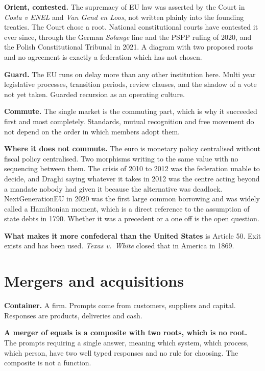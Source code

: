 \documentclass[11pt,a4paper]{article}
\begin{document}
\textbf{Orient, contested.} The supremacy of EU law was asserted by the Court in
\emph{Costa v ENEL} and \emph{Van Gend en Loos}, not written plainly into the
founding treaties. The Court chose a root. National constitutional courts have
contested it ever since, through the German \emph{Solange} line and the PSPP ruling
of 2020, and the Polish Constitutional Tribunal in 2021. A diagram with two proposed
roots and no agreement is exactly a federation which has not chosen.

\textbf{Guard.} The EU runs on delay more than any other institution here. Multi
year legislative processes, transition periods, review clauses, and the shadow of a
vote not yet taken. Guarded recursion as an operating culture.

\textbf{Commute.} The single market is the commuting part, which is why it succeeded
first and most completely. Standards, mutual recognition and free movement do not
depend on the order in which members adopt them.

\textbf{Where it does not commute.} The euro is monetary policy centralised without
fiscal policy centralised. Two morphisms writing to the same value with no
sequencing between them. The crisis of 2010 to 2012 was the federation unable to
decide, and Draghi saying whatever it takes in 2012 was the centre acting beyond a
mandate nobody had given it because the alternative was deadlock. NextGenerationEU
in 2020 was the first large common borrowing and was widely called a Hamiltonian
moment, which is a direct reference to the assumption of state debts in 1790.
Whether it was a precedent or a one off is the open question.

\textbf{What makes it more confederal than the United States} is Article 50. Exit
exists and has been used. \emph{Texas v.\ White} closed that in America in 1869.

\section{Mergers and acquisitions}

\begin{sectionbox}
\textbf{Container.} A firm. Prompts come from customers, suppliers and capital.
Responses are products, deliveries and cash.

\textbf{A merger of equals is a composite with two roots, which is no root.} The
prompts requiring a single answer, meaning which system, which process, which
person, have two well typed responses and no rule for choosing. The composite is
not a function.
\end{sectionbox}
\end{document}
